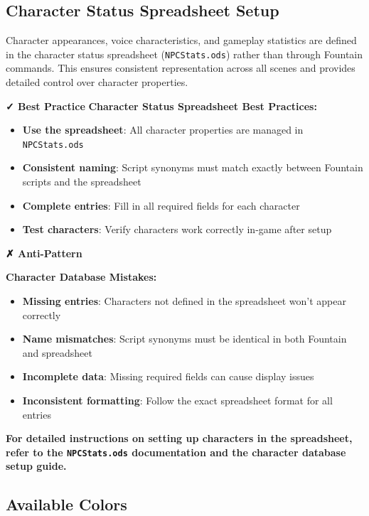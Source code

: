 \documentclass[11pt,letterpaper,oldstylefigures]{memoir}
\newenvironment{AntiPattern}
{\begingroup
\small
\setlength{\parindent}{0pt}
\setlength{\parskip}{0.5em}
\allowdisplaybreaks
\setlength{\displaywidowpenalty}{0}
\setlength{\widowpenalty}{0}
\setlength{\clubpenalty}{0}
\setlength{\interlinepenalty}{0}
\begin{tcolorbox}[
    colback=red!5,
    colframe=red!75!black,
    boxrule=0.5pt,
    arc=2pt,
    left=0.5em,
    right=0.5em,
    top=0.25em,
    bottom=0.25em
]
\textbf{✗ Anti-Pattern}
\end{tcolorbox}\par
}
{\endgroup}
\newcommand{\paragraphbreak}{\vspace{0.5em}}
\begin{document}
\subsection{Character Status Spreadsheet Setup}
\paragraphbreak

Character appearances, voice characteristics, and gameplay statistics are defined in the character status spreadsheet (\texttt{NPCStats.ods}) rather than through Fountain commands. This ensures consistent representation across all scenes and provides detailed control over character properties.

\textbf{✓ Best Practice}
\textbf{Character Status Spreadsheet Best Practices:}
\begin{itemize}
\item \textbf{Use the spreadsheet}: All character properties are managed in \texttt{NPCStats.ods}
\item \textbf{Consistent naming}: Script synonyms must match exactly between Fountain scripts and the spreadsheet
\item \textbf{Complete entries}: Fill in all required fields for each character
\item \textbf{Test characters}: Verify characters work correctly in-game after setup
\end{itemize}


\begin{AntiPattern}
\textbf{Character Database Mistakes:}
\begin{itemize}
\item \textbf{Missing entries}: Characters not defined in the spreadsheet won't appear correctly
\item \textbf{Name mismatches}: Script synonyms must be identical in both Fountain and spreadsheet
\item \textbf{Incomplete data}: Missing required fields can cause display issues
\item \textbf{Inconsistent formatting}: Follow the exact spreadsheet format for all entries
\end{itemize}
\end{AntiPattern}

\textbf{For detailed instructions on setting up characters in the spreadsheet, refer to the \texttt{NPCStats.ods} documentation and the character database setup guide.}

\subsection{Available Colors}
\paragraphbreak
\end{document}

